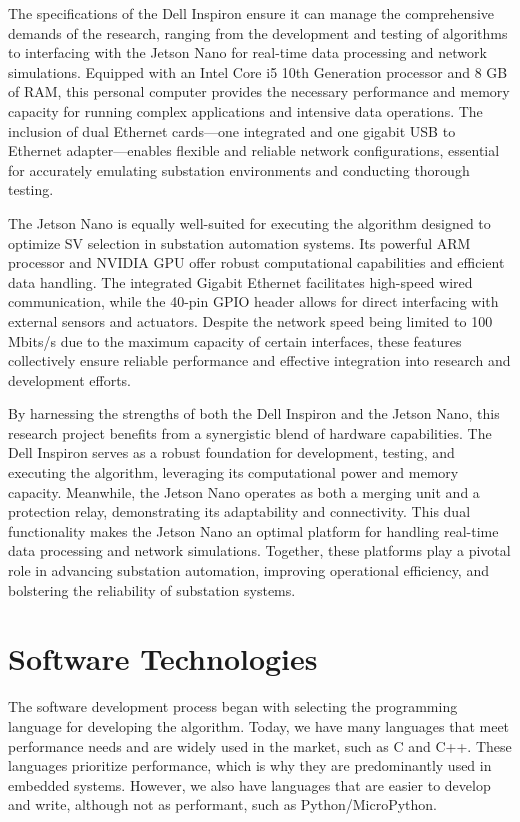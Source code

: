 The specifications of the Dell Inspiron ensure it can manage the comprehensive demands of the research, ranging from the development and testing of algorithms to interfacing with the Jetson Nano for real-time data processing and network simulations. Equipped with an Intel Core i5 10th Generation processor and 8 GB of RAM, this personal computer provides the necessary performance and memory capacity for running complex applications and intensive data operations. The inclusion of dual Ethernet cards—one integrated and one gigabit USB to Ethernet adapter—enables flexible and reliable network configurations, essential for accurately emulating substation environments and conducting thorough testing.

The Jetson Nano is equally well-suited for executing the algorithm designed to optimize SV selection in substation automation systems. Its powerful ARM processor and NVIDIA GPU offer robust computational capabilities and efficient data handling. The integrated Gigabit Ethernet facilitates high-speed wired communication, while the 40-pin GPIO header allows for direct interfacing with external sensors and actuators. Despite the network speed being limited to 100 Mbits/s due to the maximum capacity of certain interfaces, these features collectively ensure reliable performance and effective integration into research and development efforts.

By harnessing the strengths of both the Dell Inspiron and the Jetson Nano, this research project benefits from a synergistic blend of hardware capabilities. The Dell Inspiron serves as a robust foundation for development, testing, and executing the algorithm, leveraging its computational power and memory capacity. Meanwhile, the Jetson Nano operates as both a merging unit and a protection relay, demonstrating its adaptability and connectivity. This dual functionality makes the Jetson Nano an optimal platform for handling real-time data processing and network simulations. Together, these platforms play a pivotal role in advancing substation automation, improving operational efficiency, and bolstering the reliability of substation systems.

\section{Software Technologies}

The software development process began with selecting the programming language for developing the algorithm. Today, we have many languages that meet performance needs and are widely used in the market, such as C and C++. These languages prioritize performance, which is why they are predominantly used in embedded systems. However, we also have languages that are easier to develop and write, although not as performant, such as Python/MicroPython.

